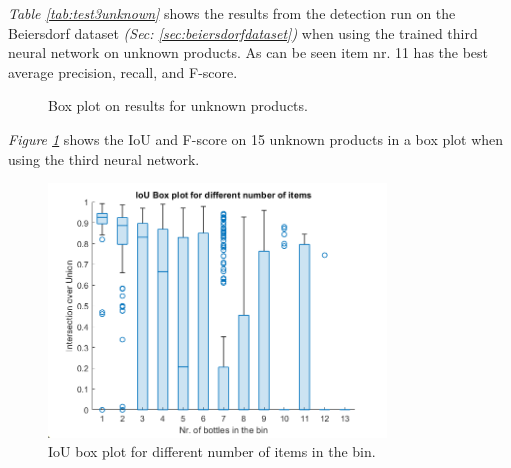 \textit{Table \ref{tab:test3unknown}} shows the results from the detection run on the Beiersdorf dataset \textit{(Sec: \ref{sec:beiersdorfdataset})} when using the trained third neural network on unknown products. As can be seen item nr. 11 has the best average precision, recall, and F-score.

\clearpage
\begin{figure}[h]
 \centering
 \hfill
 
 \caption{Box plot on results for unknown products.}
 \label{fig:v3unknowniou}
\end{figure}

\textit{Figure \ref{fig:v3unknowniou}} shows the IoU and F-score on 15 unknown products in a box plot when using the third neural network.
\begin{figure}[h]
 \centering
 \includegraphics[width=0.8\textwidth]{graphics/results/v3bottles.png}
 \caption{IoU box plot for different number of items in the bin.}
 \label{fig:v3bottles}
\end{figure}

